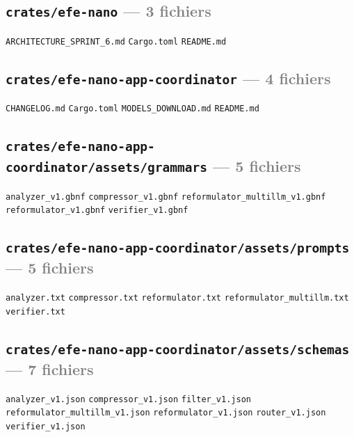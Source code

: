 \documentclass[10pt]{report}
\newcommand{\code}[1]{\texttt{\small #1}}
\begin{document}
\subsection*{\code{crates/efe-nano} \normalfont\textcolor{grey}{--- 3 fichiers}}
\begin{sloppypar}\footnotesize\raggedright
\code{ARCHITECTURE\_SPRINT\_6.md} \;\textbullet\; \code{Cargo.toml} \;\textbullet\; \code{README.md}
\end{sloppypar}

\subsection*{\code{crates/efe-nano-app-coordinator} \normalfont\textcolor{grey}{--- 4 fichiers}}
\begin{sloppypar}\footnotesize\raggedright
\code{CHANGELOG.md} \;\textbullet\; \code{Cargo.toml} \;\textbullet\; \code{MODELS\_DOWNLOAD.md} \;\textbullet\; \code{README.md}
\end{sloppypar}

\subsection*{\code{crates/efe-nano-app-coordinator/assets/grammars} \normalfont\textcolor{grey}{--- 5 fichiers}}
\begin{sloppypar}\footnotesize\raggedright
\code{analyzer\_v1.gbnf} \;\textbullet\; \code{compressor\_v1.gbnf} \;\textbullet\; \code{reformulator\_multillm\_v1.gbnf} \;\textbullet\; \code{reformulator\_v1.gbnf} \;\textbullet\; \code{verifier\_v1.gbnf}
\end{sloppypar}

\subsection*{\code{crates/efe-nano-app-coordinator/assets/prompts} \normalfont\textcolor{grey}{--- 5 fichiers}}
\begin{sloppypar}\footnotesize\raggedright
\code{analyzer.txt} \;\textbullet\; \code{compressor.txt} \;\textbullet\; \code{reformulator.txt} \;\textbullet\; \code{reformulator\_multillm.txt} \;\textbullet\; \code{verifier.txt}
\end{sloppypar}

\subsection*{\code{crates/efe-nano-app-coordinator/assets/schemas} \normalfont\textcolor{grey}{--- 7 fichiers}}
\begin{sloppypar}\footnotesize\raggedright
\code{analyzer\_v1.json} \;\textbullet\; \code{compressor\_v1.json} \;\textbullet\; \code{filter\_v1.json} \;\textbullet\; \code{reformulator\_multillm\_v1.json} \;\textbullet\; \code{reformulator\_v1.json} \;\textbullet\; \code{router\_v1.json} \;\textbullet\; \code{verifier\_v1.json}
\end{sloppypar}
\end{document}

